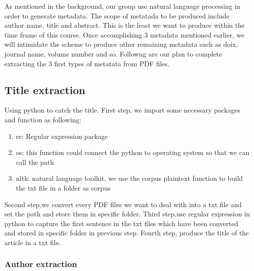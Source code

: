 	
As mentioned in the background, our group use natural language processing in order to generate metadata. The scope of metatada to be produced include author name, title and abstract. This is the least we want to produce within the time frame of this course. Once accomplishing 3 metadata mentioned earlier, we will intimidate the scheme to produce other remaining metadata such as doix, journal name, volume number and so. Followng are our plan to complete extracting the 3 first types of metatata from PDF files.
\subsection*{Title extraction}
Using python to catch the title. First step, we import some necessary packages and function as following:
\begin{enumerate}
	\item re: Regular expression package
	\item os: this function could connect the python to operating system so that we can call the path
	\item nltk: natural language toolkit, we use the corpus plaintext function to build the txt file in a folder as corpus
\end{enumerate}  
Second step,we convert every PDF files we want to deal with into a txt file and set the path and store them in specific folder.
Third step,use regular expression in python to capture the first sentence in the txt files which have been converted and stored in specific folder in previous step. 
Fourth step, produce the title of the article in a txt file.   

\subsubsection*{Author extraction}



